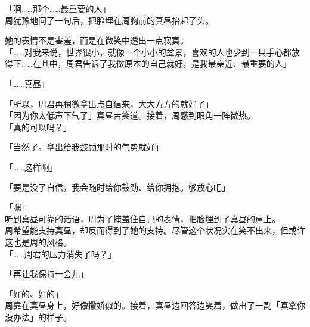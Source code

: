 「啊……那个……最重要的人」\\

周犹豫地问了一句后，把脸埋在周胸前的真昼抬起了头。

她的表情不是害羞，而是在微笑中透出一点寂寞。\\

「……对我来说，世界很小，就像一个小小的盆景，喜欢的人也少到一只手心都放得下……在其中，周君告诉了我做原本的自己就好，是我最亲近、最重要的人」

「……真昼」

「所以，周君再稍微拿出点自信来，大大方方的就好了」\\

「因为你太低声下气了」真昼苦笑道。接着，周感到眼角一阵微热。\\

「真的可以吗？」

「当然了。拿出给我鼓励那时的气势就好」

「……这样啊」

「要是没了自信，我会随时给你鼓劲、给你拥抱。够放心吧」

「嗯」\\

听到真昼可靠的话语，周为了掩盖住自己的表情，把脸埋到了真昼的肩上。\\

周希望能支持真昼，却反而得到了她的支持。尽管这个状况实在笑不出来，但或许这也是周的风格。\\

「……周君的压力消失了吗？」

「再让我保持一会儿」

「好的、好的」\\

周靠在真昼身上，好像撒娇似的。接着，真昼边回答边笑着，做出了一副「真拿你没办法」的样子。

